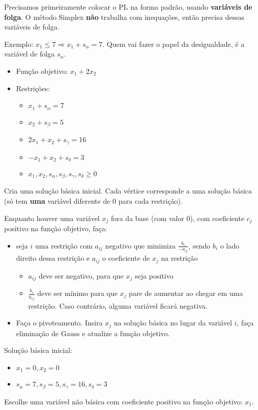 Precisamos primeiramente colocar o PL na forma padrão, usando \textbf{variáveis de folga}. O método Simplex \textbf{não} trabalha com inequações, então precisa dessas variáveis de folga.

Exemplo: $x_1 \leq 7 \Rightarrow x_1 + s_\alpha = 7$. Quem vai fazer o papel da desigualdade, é a variável de folga $s_\alpha$.

\begin{itemize}
    \item Função objetivo: $x_1 + 2x_2$
    \item Restrições:
    \begin{itemize}
        \item $x_1 + s_\alpha = 7$
        \item $x_2 + s_\beta = 5$
        \item $2x_1 + x_2 + s_\gamma = 16$
        \item $-x_1 + x_2 + s_\delta = 3$
        \item $x_1,x_2,s_\alpha,s_\beta,s_\gamma,s_\delta\geq 0$
    \end{itemize}
\end{itemize}

Cria uma solução básica inicial. Cada vértice corresponde a uma solução básica (só tem \textbf{uma} variável diferente de 0 para cada restrição).

Enquanto houver uma variável $x_j$ fora da base (com valor 0), com coeficiente $c_j$ positivo na função objetivo, faça:

\begin{itemize}
    \item seja $i$ uma restrição com $a_{ij}$ negativo que minimiza $\frac{b_i}{-a_{ij}}$, sendo $b_i$ o lado direito dessa restrição e $a_{ij}$ o coeficiente de $x_j$ na restrição
    \begin{itemize}
        \item $a_{ij}$ deve ser negativo, para que $x_j$ seja positivo
        \item $\frac{b_i}{a_{ij}}$ deve ser mínimo para que $x_j$ pare de aumentar ao chegar em uma restrição. Caso contrário, alguma variável ficará negativa.
    \end{itemize}
    \item Faça o pivoteamento. Insira $x_j$ na solução básica no lugar da variável $i$, faça eliminação de Gauss e atualize a função objetivo.
\end{itemize}

\begin{example}
    Solução básica inicial:
    \begin{itemize}
        \item $x_1 = 0, x_2 = 0$
        \item $s_\alpha = 7, s_\beta = 5, s_\gamma = 16, s_\delta = 3$
    \end{itemize}
    Escolhe uma variável não básica com coeficiente positivo na função objetivo: $x_1$.
\end{example}


